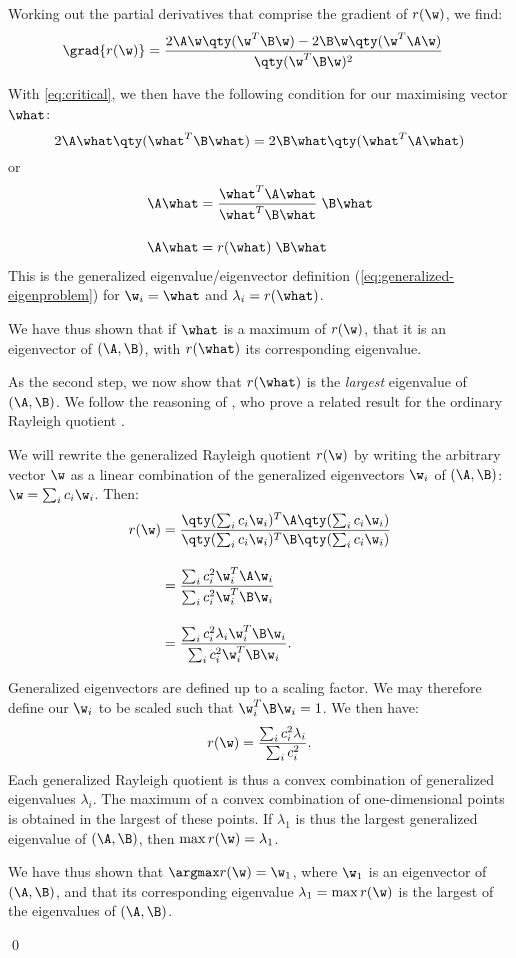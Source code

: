 Working out the partial derivatives that comprise the gradient of $r(\w)$, we find:
\begin{align*}
\grad{r(\w)} &= \frac{2 \A \w \qty(\w^T \B \w) 
                      - 2 \B \w \qty(\w^T \A \w)}
                     {\qty(\w^T \B \w)^2}
\end{align*}

With \cref{eq:critical}, we then have the following condition for our maximising vector $\what$:
\[
2 \A \what \qty(\what^T \B \what) = 2 \B \what \qty(\what^T \A \what)
\]
or
\begin{align*}
\A \what &= \frac{\what^T \A \what}
                 {\what^T \B \what} \; \B \what  \\[1em]
\A \what &= r(\what) \; \B \what
\end{align*}
This is the generalized eigenvalue/eigenvector definition (\cref{eq:generalized-eigenproblem}) for $\w_i = \what$ and $\lambda_i = r(\what)$.

We have thus shown that if $\what$ is a maximum of $r(\w)$, that it is an eigenvector of $(\A,\B)$, with $r(\what)$ its corresponding eigenvalue.

As the second step, we now show that $r(\what)$ is the \emph{largest} eigenvalue of $(\A,\B)$. We follow the reasoning of \citeauthor{Trefethen1997}, who prove a related result for the ordinary Rayleigh quotient \cite[p. 204]{Trefethen1997}.

We will rewrite the generalized Rayleigh quotient $r(\w)$ by writing the arbitrary vector $\w$ as a linear combination of the generalized eigenvectors $\w_i$ of $(\A,\B)$: $\w = \sum_i c_i \w_i$. Then:
\begin{align*}
r(\w) &= \frac{\qty(\sum_i c_i \w_i)^T \A \qty(\sum_i c_i \w_i)}
              {\qty(\sum_i c_i \w_i)^T \B \qty(\sum_i c_i \w_i)} \\[1em]
      &= \frac{\sum_i c_i^2 \w_i^T \A \w_i}
              {\sum_i c_i^2 \w_i^T \B \w_i} \\[1em]
      &= \frac{\sum_i c_i^2 \lambda_i \w_i^T \B \w_i}
              {\sum_i c_i^2 \w_i^T \B \w_i}.
\end{align*}

Generalized eigenvectors are defined up to a scaling factor. We may therefore define our $\w_i$ to be scaled such that $\w_i^T \B \w_i = 1$. We then have:
\[
r(\w) = \frac{\sum_i c_i^2 \lambda_i}{\sum_i c_i^2}.
\]
%
Each generalized Rayleigh quotient is thus a convex combination of generalized eigenvalues $\lambda_i$. The maximum of a convex combination of one-dimensional points is obtained in the largest of these points. If $\lambda_1$ is thus the largest generalized eigenvalue of $(\A,\B)$, then $\max{r(\w)} = \lambda_1$.

We have thus shown that $\argmax r(\w) = \w_1$, where $\w_1$ is an eigenvector of $(\A,\B)$, and that its corresponding eigenvalue $\lambda_1 = \max r(\w)$ is the largest of the eigenvalues of $(\A,\B)$.

\qed
